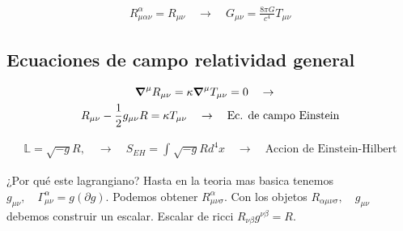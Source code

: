 \documentclass{article}
\begin{document}
\begin{gather*}
  R _{\mu\alpha\nu} ^ {\alpha} = R _{\mu\nu}  \quad \rightarrow \quad G _{\mu\nu} = \frac{8 \pi G }{c ^ {4 }}T _{\mu\nu}  
\end{gather*}

\subsection{Ecuaciones de campo relatividad general }
\begin{gather*}
  \grad ^\mu R _{\mu\nu} = \kappa \grad ^ {\mu} T _{\mu\nu}  =0 \quad \rightarrow \quad  \\
  R _{\mu\nu} - \frac{1}{2}g _{\mu\nu} R = \kappa T _{\mu\nu} \quad \rightarrow  \quad \text{Ec. de campo Einstein} 
\end{gather*}

\begin{gather*}
  \mathbb{L} = \sqrt{-g } R, \quad \rightarrow \quad S _{EH } = \displaystyle\int_{}^{} \sqrt{-g }R d ^ {4 }x \quad \rightarrow \quad \text{Accion de Einstein-Hilbert}   
\end{gather*}

¿Por qué este lagrangiano? Hasta en la teoria mas basica tenemos $ g _{\mu\nu} , \quad \Gamma _{\mu\nu} ^ {\alpha} = g(\partial g ) $. Podemos obtener $ R _{\mu\nu\sigma} ^ {\alpha} $. Con los objetos $ R _{\alpha\mu\nu\sigma} , \quad g _{\mu\nu}  $ debemos construir un escalar. Escalar de ricci $ R _{\nu\beta} g ^ {\nu\beta} = R  $.
\end{document}
